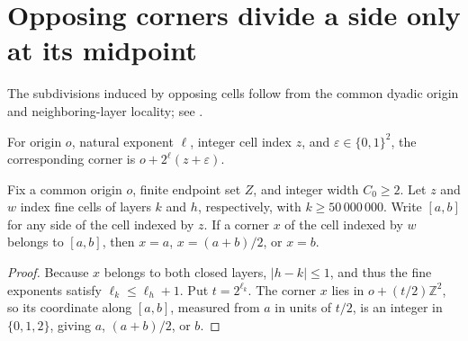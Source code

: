 \section{Opposing corners divide a side only at its midpoint}
\label{sec:area_law_side_subdivision}

The subdivisions induced by opposing cells follow from the common dyadic
origin and neighboring-layer locality; see \cite[Section~11]{OpenAI2026AreaLaw}.


\begin{definition}
    \label{def:area_law_cell_corner}
    \leanok
    For origin $o$, natural exponent $\ell$, integer cell index $z$,
    and $\varepsilon\in\{0,1\}^2$, the corresponding corner is
    $o+2^\ell(z+\varepsilon)$.
\end{definition}

\begin{lemma}
    \label{thm:area_law_corner_side_subdivision}
    \leanok
    Fix a common origin $o$, finite endpoint set $Z$, and integer
    width $C_0\ge2$. Let $z$ and $w$ index fine cells of layers
    $k$ and $h$, respectively, with $k\ge50\,000\,000$. Write $[a,b]$
    for any side of the cell indexed by $z$. If a corner $x$
    of the cell indexed by $w$ belongs to $[a,b]$, then
    $x=a$, $x=(a+b)/2$, or $x=b$.
\end{lemma}
\begin{proof}\leanok
    Because $x$ belongs to both closed layers, $|h-k|\le1$, and thus the fine
    exponents satisfy $\ell_k\le\ell_h+1$. Put $t=2^{\ell_k}$. The corner $x$
    lies in $o+(t/2)\mathbb Z^2$, so its coordinate along $[a,b]$, measured
    from $a$ in units of $t/2$, is an integer in $\{0,1,2\}$, giving $a$,
    $(a+b)/2$, or $b$.
\end{proof}
